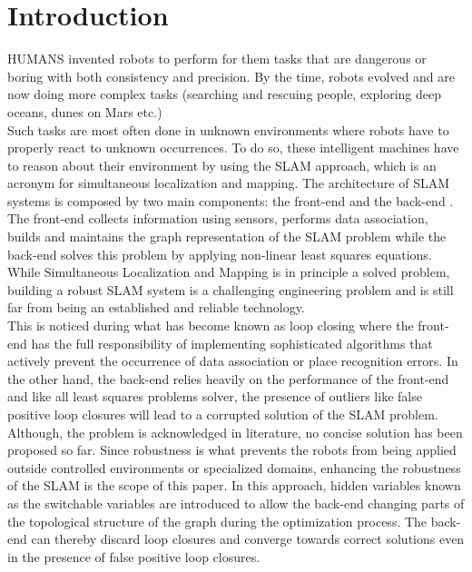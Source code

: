 \documentclass[9pt,technote]{IEEEtran}
\begin{document}
\section{Introduction}
HUMANS invented robots to perform for them tasks that are dangerous or boring with both consistency and precision. By the time, robots evolved and are now doing more complex tasks (searching and rescuing people, exploring deep oceans, dunes on Mars etc.)\\
Such tasks are most often done in unknown environments where robots have to properly react to unknown occurrences.
To do so, these intelligent machines have to reason about their environment by using the SLAM approach, which is an acronym for simultaneous localization and mapping.
The architecture of SLAM systems is composed by two main components: the front-end and the back-end \cite{sunderhauf2012switchable}.
The front-end collects information using sensors, performs data association, builds and maintains the graph representation of the SLAM problem while the back-end solves this problem by applying non-linear least squares equations.
While Simultaneous Localization and Mapping is in principle a solved problem, building a robust SLAM system is a challenging engineering problem and is still far from being an established and reliable technology.\\ 
This is noticed during what has become known as loop closing where the front-end has the full responsibility of implementing sophisticated algorithms that actively prevent the occurrence of data association or place recognition errors. 
In the other hand, the back-end relies heavily on the performance of the front-end and like all least squares problems solver, the presence of outliers like false positive loop closures will lead to a corrupted solution of the SLAM problem.
Although, the problem is acknowledged in literature, no concise solution has been proposed so far.\cite{kaess2011isam2}  \cite{kummerle2011g}
Since robustness is what prevents the robots from being applied outside controlled environments or specialized domains, enhancing the robustness of the SLAM is the scope of this paper.
In this approach, hidden variables known as the switchable variables are introduced to allow the back-end changing parts of the topological structure of the graph during the optimization process. The back-end can thereby discard loop closures and converge towards correct solutions even in the presence of false positive loop closures.\\
\end{document}
